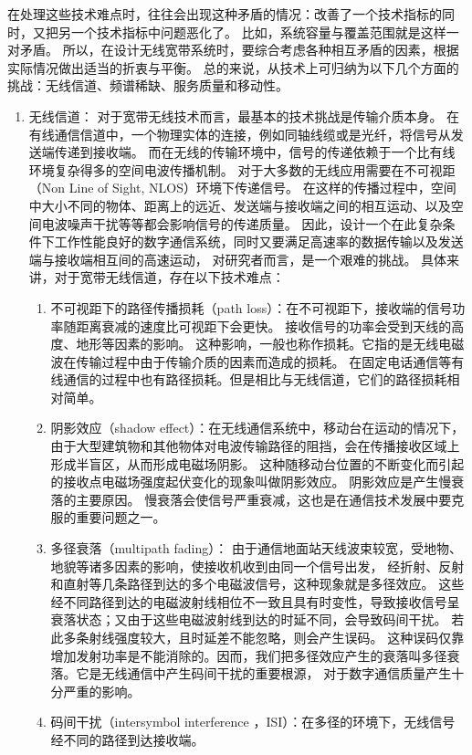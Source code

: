 在处理这些技术难点时，往往会出现这种矛盾的情况：改善了一个技术指标的同时，又把另一个技术指标中问题恶化了。
比如，系统容量与覆盖范围就是这样一对矛盾。
所以，在设计无线宽带系统时，要综合考虑各种相互矛盾的因素，根据实际情况做出适当的折衷与平衡。
总的来说，从技术上可归纳为以下几个方面的挑战：无线信道、频谱稀缺、服务质量和移动性。
\begin{enumerate}[1)]
    \item {无线信道：}
对于宽带无线技术而言，最基本的技术挑战是传输介质本身。
在有线通信信道中，一个物理实体的连接，例如同轴线缆或是光纤，将信号从发送端传递到接收端。
而在无线的传输环境中，信号的传递依赖于一个比有线环境复杂得多的空间电波传播机制。
对于大多数的无线应用需要在不可视距（Non Line of Sight, NLOS）环境下传递信号。
在这样的传播过程中，空间中大小不同的物体、距离上的远近、发送端与接收端之间的相互运动、以及空间电波噪声干扰等等都会影响信号的传递质量。
因此，设计一个在此复杂条件下工作性能良好的数字通信系统，同时又要满足高速率的数据传输以及发送端与接收端相互间的高速运动，
对研究者而言，是一个艰难的挑战。
具体来讲，对于宽带无线信道，存在以下技术难点：
\begin{enumerate}[(1)]
\item 不可视距下的路径传播损耗（path loss）：在不可视距下，接收端的信号功率随距离衰减的速度比可视距下会更快。
接收信号的功率会受到天线的高度、地形等因素的影响。
这种影响，一般也称作损耗。它指的是无线电磁波在传输过程中由于传输介质的因素而造成的损耗。
在固定电话通信等有线通信的过程中也有路径损耗。但是相比与无线信道，它们的路径损耗相对简单。
\item 阴影效应（shadow effect）：在无线通信系统中，移动台在运动的情况下，由于大型建筑物和其他物体对电波传输路径的阻挡，会在传播接收区域上形成半盲区，从而形成电磁场阴影。
这种随移动台位置的不断变化而引起的接收点电磁场强度起伏变化的现象叫做阴影效应。
阴影效应是产生慢衰落的主要原因。
慢衰落会使信号严重衰减，这也是在通信技术发展中要克服的重要问题之一。
\item 多径衰落（multipath fading）： 由于通信地面站天线波束较宽，受地物、地貌等诸多因素的影响，使接收机收到由同一个信号出发，
    经折射、反射和直射等几条路径到达的多个电磁波信号，这种现象就是多径效应。
这些经不同路径到达的电磁波射线相位不一致且具有时变性，导致接收信号呈衰落状态；又由于这些电磁波射线到达的时延不同，会导致码间干扰。
若此多条射线强度较大，且时延差不能忽略，则会产生误码。
这种误码仅靠增加发射功率是不能消除的。因而，我们把多径效应产生的衰落叫多径衰落。它是无线通信中产生码间干扰的重要根源，
对于数字通信质量产生十分严重的影响。
\item 码间干扰（intersymbol interference ，ISI）：在多径的环境下，无线信号经不同的路径到达接收端。

\end{enumerate}
\end{enumerate}
